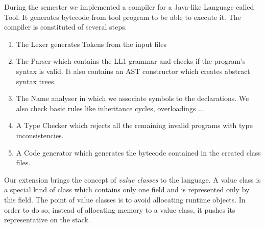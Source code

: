 During the semester we implemented a compiler for a Java-like Language called Tool. It generates bytecode from tool program to be able to execute it. \newline
The compiler is constituted of several steps.

\begin{enumerate}
\item The Lexer generates Tokens from the input files
\item The Parser which contains the LL1 grammar and checks if the program's syntax is valid. It also contains an AST constructor which creates abstract syntax trees.
\item The Name analyser in which we associate symbols to the declarations. We also check basic rules like inheritance cycles, overloadings ...
\item A Type Checker which rejects all the remaining invalid programs with type inconsistencies.
\item A Code generator which generates the bytecode contained in the created class files.
\end{enumerate}

Our extension brings the concept of \textit{value classes} to the language. \newline 
A value class is a special kind of class which contains only one field and is represented only by this field. The point of value classes is to avoid allocating runtime objects. In order to do so, instead of allocating memory to a value class, it pushes its representative on the stack.